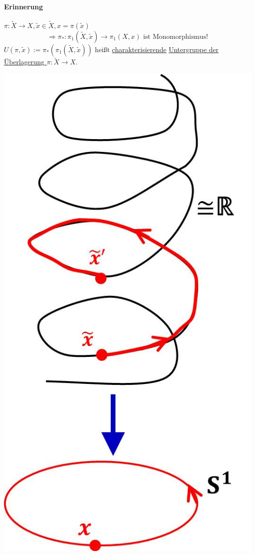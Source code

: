 \documentclass[a4paper,11pt,notitlepage]{report}
\theoremstyle{definition}
\begin{document}

\paragraph{Erinnerung} $\pi \colon \widetilde{X} \rightarrow X, \widetilde{x} \in \widetilde{X}, x = \pi(\widetilde{x})$
$$\Rightarrow \pi_* \colon \pi_1(\widetilde{X},\widetilde{x}) \rightarrow \pi_1(X,x) \text{ ist Monomorphismus!}$$
$U(\pi, \widetilde{x}) := \pi_*(\pi_1(\widetilde{X},\widetilde{x}))$ heißt \underline{charakterisierende} \underline{Untergruppe der Überlagerung $\pi \colon \widetilde{X} \rightarrow X$}.
\begin{center}
	 	\includegraphics[scale=0.5]{images/2011_12_20_Bild1.jpg}
	 \end{center}
\end{document}

